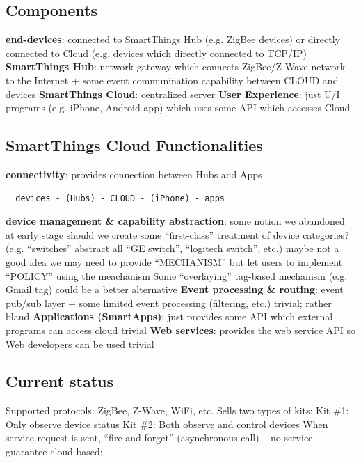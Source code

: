 \documentclass{myproc}
\begin{document}
\subsection{Components}
\bit
\w \textcolor{red2}{\bf{end-devices}}: connected to SmartThings Hub
  (e.g. ZigBee devices) or directly connected to Cloud (e.g. devices which
  directly connected to TCP/IP)
\w \textcolor{red2}{\bf{SmartThings Hub}}: network gateway which connects
ZigBee/Z-Wave network to the Internet + some event communination capability
between CLOUD and devices
\w \textcolor{red2}{\bf{SmartThings Cloud}}: centralized server
\w \textcolor{red2}{\bf{User Experience}}: just U/I programs (e.g. iPhone,
Android app) which uses some API which accesses Cloud
\eit

\subsection{SmartThings Cloud Functionalities}
\bit
\w \textcolor{red2}{\bf{connectivity}}: provides connection between Hubs and
Apps
\begin{verbatim}
  devices - (Hubs) - CLOUD - (iPhone) - apps
\end{verbatim}
\w \textcolor{red2}{\bf{device management \& capability abstraction}}:
  \bit
  \w \textcolor{blue2}{some notion we abandoned at early stage}
  \w \textcolor{blue2}{should we create some ``first-class'' treatment of device categories?}
     (e.g. ``switches'' abstract all ``GE switch'', ``logitech switch'', etc.)
  \w \textcolor{blue2}{maybe not a good idea}
  \w \textcolor{blue2}{we may need to provide ``MECHANISM'' but let users to implement
  ``POLICY'' using the meachanism}
  \w \textcolor{blue2}{Some ``overlaying'' tag-based mechanism (e.g. Gmail tag) could be a
  better alternative}
  \eit
\w \textcolor{red2}{\bf{Event processing \& routing}}: event pub/sub layer
   + some limited event processing (filtering, etc.)
  \bit
  \w trivial; rather bland
  \eit
\w \textcolor{red2}{\bf{Applications (SmartApps)}}: just provides some API
which external programs can access cloud
  \bit
  \w trivial
  \eit
\w \textcolor{red2}{\bf{Web services}}: provides the web service API so Web
developers can be used
  \bit
  \w trivial
  \eit
\eit

\subsection{Current status}
\bit
\w Supported protocols: ZigBee, Z-Wave, WiFi, etc.
\w Sells two types of kits:
  \bit
  \w Kit \#1: Only observe device status
  \w Kit \#2: Both observe and control devices
  \eit
\w When service request is sent, ``fire and forget'' (asynchronous call) -- no
   service guarantee  
\w cloud-based: 
\eit
\end{document}
